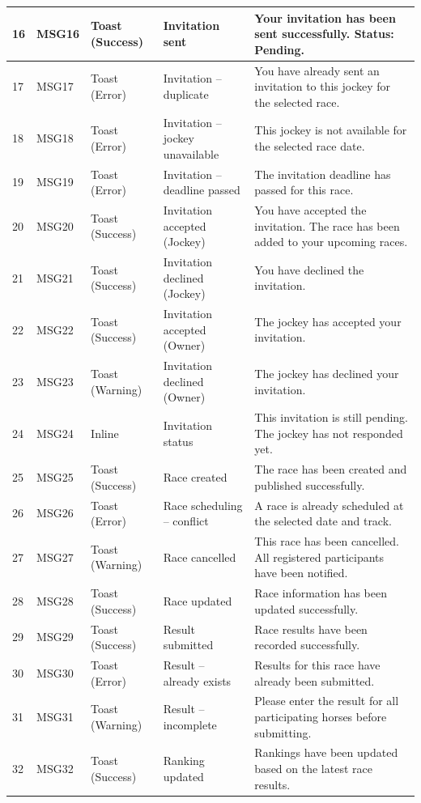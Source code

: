 \begin{longtable}{|p{}|p{}|p{}|p{}|p{}|}
16 & MSG16 & Toast (Success) & Invitation sent & Your invitation has been sent successfully. Status: Pending. \\
\hline
17 & MSG17 & Toast (Error) & Invitation -- duplicate & You have already sent an invitation to this jockey for the selected race. \\
\hline
18 & MSG18 & Toast (Error) & Invitation -- jockey unavailable & This jockey is not available for the selected race date. \\
\hline
19 & MSG19 & Toast (Error) & Invitation -- deadline passed & The invitation deadline has passed for this race. \\
\hline
20 & MSG20 & Toast (Success) & Invitation accepted (Jockey) & You have accepted the invitation. The race has been added to your upcoming races. \\
\hline
21 & MSG21 & Toast (Success) & Invitation declined (Jockey) & You have declined the invitation. \\
\hline
22 & MSG22 & Toast (Success) & Invitation accepted (Owner) & The jockey has accepted your invitation. \\
\hline
23 & MSG23 & Toast (Warning) & Invitation declined (Owner) & The jockey has declined your invitation. \\
\hline
24 & MSG24 & Inline & Invitation status & This invitation is still pending. The jockey has not responded yet. \\
\hline

25 & MSG25 & Toast (Success) & Race created & The race has been created and published successfully. \\
\hline
26 & MSG26 & Toast (Error) & Race scheduling -- conflict & A race is already scheduled at the selected date and track. \\
\hline
27 & MSG27 & Toast (Warning) & Race cancelled & This race has been cancelled. All registered participants have been notified. \\
\hline
28 & MSG28 & Toast (Success) & Race updated & Race information has been updated successfully. \\
\hline

29 & MSG29 & Toast (Success) & Result submitted & Race results have been recorded successfully. \\
\hline
30 & MSG30 & Toast (Error) & Result -- already exists & Results for this race have already been submitted. \\
\hline
31 & MSG31 & Toast (Warning) & Result -- incomplete & Please enter the result for all participating horses before submitting. \\
\hline
32 & MSG32 & Toast (Success) & Ranking updated & Rankings have been updated based on the latest race results. \\
\hline


\end{longtable}
